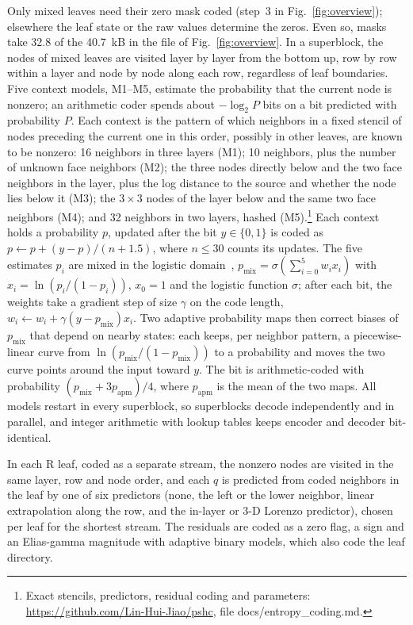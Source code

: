 \documentclass[conference]{IEEEtran}
\newcommand{\revise}[1]{{\leavevmode\color{blue}#1}}
\begin{document}
Only mixed leaves need their zero mask coded (step~3 in Fig.~\ref{fig:overview}); elsewhere the leaf state or the raw values determine the zeros. Even so, masks take 32.8 of the 40.7~kB in the file of Fig.~\ref{fig:overview}. In a superblock, the nodes of mixed leaves are visited layer by layer from the bottom up, row by row within a layer and node by node along each row, regardless of leaf boundaries. Five context models, M1--M5, estimate the probability that the current node is nonzero; an arithmetic coder spends about $-\log_2P$ bits on a bit predicted with probability $P$. Each context is the pattern of which neighbors in a fixed stencil of nodes preceding the current one in this order, possibly in other leaves, are known to be nonzero: 16 neighbors in three layers (M1); 10 neighbors, plus the number of unknown face neighbors (M2); the three nodes directly below and the two face neighbors in the layer, plus the log distance to the source and whether the node lies below it (M3); the $3\times3$ nodes of the layer below and the same two face neighbors (M4); and 32 neighbors in two layers, hashed (M5).\footnote{Exact stencils, predictors\revise{, residual coding} and parameters: \url{https://github.com/Lin-Hui-Jiao/pshc}, file docs/entropy\_coding.md.}\xdef\specfn{\the\value{footnote}} Each context holds a probability $p$, updated after the bit $y\in\{0,1\}$ is coded as $p\leftarrow p+(y-p)/(n+1.5)$, where $n\le30$ counts its updates. The five estimates $p_i$ are mixed in the logistic domain~\cite{mahoney2005mixing}, $p_{\mathrm{mix}}=\sigma(\sum_{i=0}^{5}w_ix_i)$ with $x_i=\ln(p_i/(1-p_i))$, $x_0=1$ and the logistic function $\sigma$; after each bit, the weights take a gradient step of size $\gamma$ on the code length, $w_i\leftarrow w_i+\gamma(y-p_{\mathrm{mix}})x_i$. Two adaptive probability maps then correct biases of $p_{\mathrm{mix}}$ that depend on nearby states: each keeps, per neighbor pattern, a piecewise-linear curve from $\ln(p_{\mathrm{mix}}/(1-p_{\mathrm{mix}}))$ to a probability and moves the two curve points around the input toward $y$. The bit is arithmetic-coded with probability $(p_{\mathrm{mix}}+3p_{\mathrm{apm}})/4$, where $p_{\mathrm{apm}}$ is the mean of the two maps. All models restart in every superblock, so superblocks decode independently and in parallel, and integer arithmetic with lookup tables keeps encoder and decoder bit-identical.

In each R leaf, coded as a separate stream, the nonzero nodes are visited in the same layer, row and node order, and each $q$ is predicted from coded neighbors in the leaf by one of six predictors (none, the left or the lower neighbor, linear extrapolation along the row, and the in-layer or 3-D Lorenzo predictor), chosen per leaf for the shortest stream. The residuals are coded as a zero flag, a sign and an Elias-gamma magnitude with adaptive binary models, which also code the leaf directory.\revise{\footnotemark[\specfn]}
\end{document}

